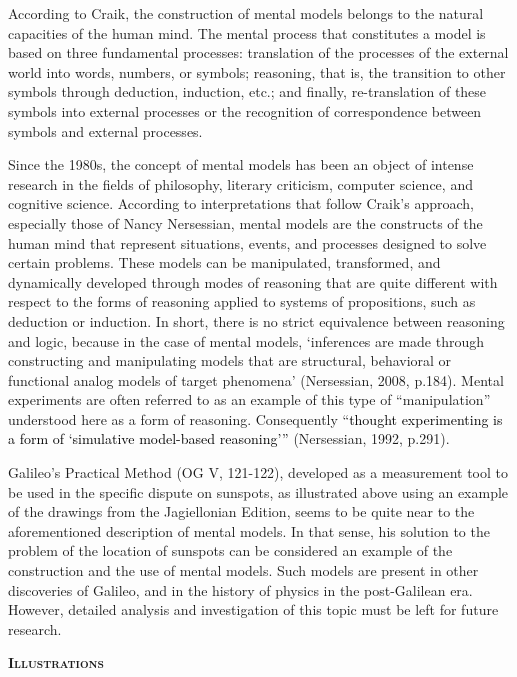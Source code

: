 \documentclass[a4paper]{article}
\begin{document}
According to Craik, the construction of mental models belongs to the natural capacities of the human mind. The mental
process that constitutes a model is based on three fundamental processes: translation of the processes of the external
world into words, numbers, or symbols; reasoning, that is, the transition to other symbols through deduction,
induction, etc.; and finally, re-translation of these symbols into external processes or the recognition of
correspondence between symbols and external processes.

Since the 1980s, the concept of mental models has been an object of intense research in the fields of philosophy,
literary criticism, computer science, and cognitive science. According to interpretations that follow Craik’s approach,
especially those of Nancy Nersessian, mental models are the constructs of the human mind that represent situations,
events, and processes designed to solve certain problems. These models can be manipulated, transformed, and dynamically
developed through modes of reasoning that are quite different with respect to the forms of reasoning applied to systems
of propositions, such as deduction or induction. In short, there is no strict equivalence between reasoning and logic,
because in the case of mental models, ‘inferences are made through constructing and manipulating models that are
structural, behavioral or functional analog models of target phenomena’ \label{ref:RNDTNzkt8wP4B}(Nersessian, 2008,
p.184). Mental experiments are often referred to as an example of this type of “manipulation” understood here as a form
of reasoning. Consequently “\textcolor{black}{thought experimenting is a form of ‘simulative model-based reasoning’”}
\label{ref:RNDuzOiOvTu5n}(Nersessian, 1992, p.291). 

Galileo’s Practical Method (OG V, 121-122), developed as a measurement tool to be used in the specific dispute on
sunspots, as illustrated above using an example of the drawings from the Jagiellonian Edition, seems to be quite near
to the aforementioned description of mental models. In that sense, his solution to the problem of the location of
sunspots can be considered an example of the construction and the use of mental models. Such models are present in
other discoveries of Galileo, and in the history of physics in the post-Galilean era. However, detailed analysis and
investigation of this topic must be left for future research. 

{\centering\bfseries\scshape
Illustrations
\par}
\end{document}
